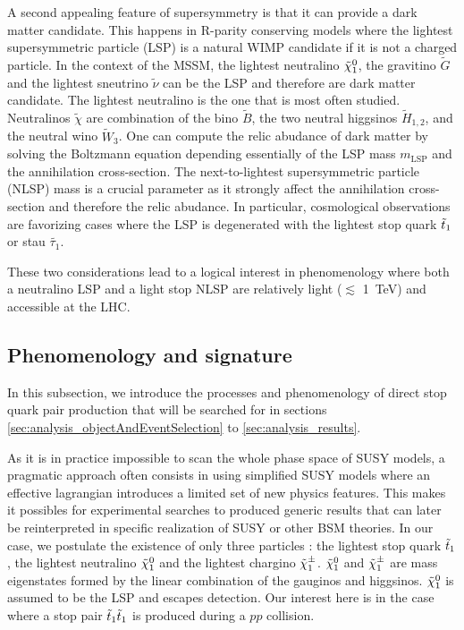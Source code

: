         A second appealing feature of supersymmetry is that it can provide a dark matter 
        candidate. This happens in R-parity conserving models where the lightest supersymmetric
        particle (LSP) is a natural WIMP candidate if it is not a charged particle. In the
        context of the MSSM, the lightest neutralino $\tilde{\chi}_1^0$, the gravitino $\tilde{G}$
        and the lightest sneutrino $\tilde{\nu}$ can be the LSP and therefore are dark matter
        candidate. The lightest neutralino is the one that is most often studied. Neutralinos
        $\tilde{\chi}$ are combination of the bino $\tilde{B}$, the two neutral higgsinos 
        $\tilde{H}_{1,2}$, and the neutral wino $\tilde{W}_3$. One can compute the relic
        abudance of dark matter by solving the Boltzmann equation \cite{EllisDarkMatter}
        depending essentially of the LSP mass $m_{\text{LSP}}$ and the annihilation cross-section.
        The next-to-lightest supersymmetric particle (NLSP) mass is a crucial parameter as 
        it strongly affect the annihilation cross-section and therefore the relic abudance. 
        In particular, cosmological observations are favorizing cases where the LSP is 
        degenerated with the lightest stop quark $\tilde{t}_1$ or stau $\tilde{\tau_1}$.
        
        These two considerations lead to a logical interest in phenomenology where both a 
        neutralino LSP and a light stop NLSP are relatively light ($\lesssim$ 1~TeV) and 
        accessible at the LHC.

        \subsection{Phenomenology and signature}

        In this subsection, we introduce the processes and phenomenology of direct stop 
        quark pair production that will be searched for in sections 
        \ref{sec:analysis_objectAndEventSelection} to \ref{sec:analysis_results}.
        
        As it is in practice impossible to scan the whole phase space of SUSY models, a 
        pragmatic approach often consists in using simplified SUSY models where an 
        effective lagrangian introduces a limited set of new physics features. This makes
        it possibles for experimental searches to produced generic results that can later
        be reinterpreted in specific realization of SUSY \cite{LiemSMS, SmodelS} 
        or other BSM theories. In our case, we postulate the existence of only three 
        particles : the lightest stop quark $\tilde{t}_1$, the lightest neutralino $\tilde{\chi}_1^0$ 
        and the lightest chargino $\tilde{\chi}_1^\pm$. $\tilde{\chi}_1^0$ and $\tilde{\chi}_1^\pm$ are mass 
        eigenstates formed by the linear combination of the gauginos and  higgsinos. 
        $\tilde{\chi}_1^0$ is assumed to be the LSP and escapes detection. Our interest here 
        is in the case where a stop pair $\tilde{t}_1\tilde{t}_1$ is produced during a $pp$ collision.

